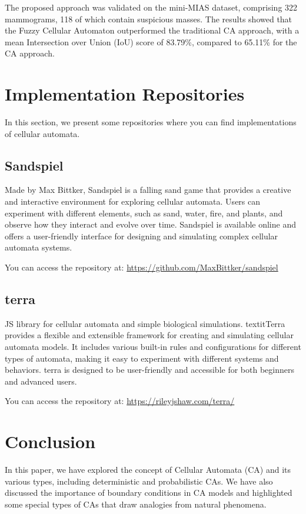 \documentclass[9pt,a4paper,twoside]{tau-class/tau}
\begin{document}
The proposed approach was validated on the mini-MIAS dataset, comprising 322 mammograms, 118 of which contain suspicious masses. The results showed that the Fuzzy Cellular Automaton outperformed the traditional CA approach, with a mean Intersection over Union (IoU) score of 83.79\%, compared to 65.11\% for the CA approach.



\section{Implementation Repositories}

In this section, we present some repositories where you can find implementations of cellular automata.

\subsection*{Sandspiel}
Made by Max Bittker, Sandspiel is a falling sand game that provides a creative and interactive environment for exploring cellular automata. Users can experiment with different elements, such as sand, water, fire, and plants, and observe how they interact and evolve over time. Sandspiel is available online and offers a user-friendly interface for designing and simulating complex cellular automata systems.

You can access the repository at: \url{https://github.com/MaxBittker/sandspiel}
\subsection*{terra}
JS library for cellular automata and simple biological simulations. textit{Terra} provides a flexible and extensible framework for creating and simulating cellular automata models. It includes various built-in rules and configurations for different types of automata, making it easy to experiment with different systems and behaviors. terra is designed to be user-friendly and accessible for both beginners and advanced users.

You can access the repository at: \url{https://rileyjshaw.com/terra/}
\section{Conclusion}
In this paper, we have explored the concept of Cellular Automata (CA) and its various types, including deterministic and probabilistic CAs. We have also discussed the importance of boundary conditions in CA models and highlighted some special types of CAs that draw analogies from natural phenomena.
\end{document}
